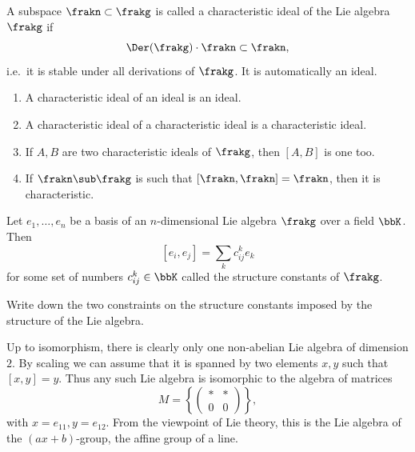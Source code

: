 \begin{defn}
    A subspace $\frakn\subset \frakg$ is called a characteristic ideal of the Lie algebra $\frakg$ if 
    \[\Der(\frakg)\cdot \frakn\subset \frakn,\]
    i.e.~it is stable under all derivations of $\frakg$. It is automatically an ideal.
\end{defn}

\begin{xca}
\begin{enumerate}
    \item A characteristic ideal of an ideal is an ideal.
    \item A characteristic ideal of a characteristic ideal is a characteristic ideal.
    \item If $A,B$ are two characteristic ideals of $\frakg$, then $[A,B]$ is one too.
    \item If $\frakn\sub \frakg$ is such that $[\frakn,\frakn]=\frakn$, then it is characteristic.
\end{enumerate}
\end{xca}

\begin{defn}
    Let $e_1,\ldots,e_n$ be a basis of an $n$-dimensional Lie algebra $\frakg$ over a field $\bbK$. Then
    \[[e_i,e_j]=\sum_k c_{ij}^k e_k\]
    for some set of numbers $c_{ij}^k\in\bbK$ called the structure constants of $\frakg$.
\end{defn}

\begin{xca}\label{xca structure constants}
    Write down the two constraints on the structure constants imposed by the structure of the Lie algebra.
\end{xca}

\begin{example}
    Up to isomorphism, there is clearly only one non-abelian Lie algebra of dimension $2$. By scaling we can assume that it is spanned by two elements $x,y$ such that $[x,y]=y$. Thus any such Lie algebra is isomorphic to the algebra of matrices 
    \[M=\left\{\begin{pmatrix}
        \ast &\ast \\
        0&0
    \end{pmatrix}\right\},\]
    with $x=e_{11}, y=e_{12}$. From the viewpoint of Lie theory, this is the Lie algebra of the $(ax+b)$-group, the affine group of a line.
\end{example}


